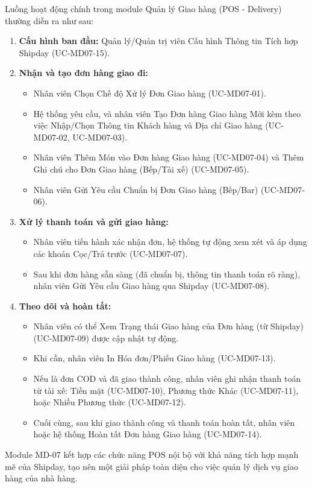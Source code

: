 \label{sssec:md07_overall_workflow}
Luồng hoạt động chính trong module Quản lý Giao hàng (POS - Delivery) thường diễn ra như sau:
\begin{enumerate}
    \item \textbf{Cấu hình ban đầu:} Quản lý/Quản trị viên Cấu hình Thông tin Tích hợp Shipday (UC-MD07-15).
    \item \textbf{Nhận và tạo đơn hàng giao đi:}
        \begin{itemize}
            \item Nhân viên Chọn Chế độ Xử lý Đơn Giao hàng (UC-MD07-01).
            \item Hệ thống yêu cầu, và nhân viên Tạo Đơn hàng Giao hàng Mới kèm theo việc Nhập/Chọn Thông tin Khách hàng và Địa chỉ Giao hàng (UC-MD07-02, UC-MD07-03).
            \item Nhân viên Thêm Món vào Đơn hàng Giao hàng (UC-MD07-04) và Thêm Ghi chú cho Đơn Giao hàng (Bếp/Tài xế) (UC-MD07-05).
            \item Nhân viên Gửi Yêu cầu Chuẩn bị Đơn Giao hàng (Bếp/Bar) (UC-MD07-06).
        \end{itemize}
    \item \textbf{Xử lý thanh toán và gửi giao hàng:}
        \begin{itemize}
            \item Nhân viên tiến hành xác nhận đơn, hệ thống tự động xem xét và áp dụng các khoản Cọc/Trả trước (UC-MD07-07).
            \item Sau khi đơn hàng sẵn sàng (đã chuẩn bị, thông tin thanh toán rõ ràng), nhân viên Gửi Yêu cầu Giao hàng qua Shipday (UC-MD07-08).
        \end{itemize}
    \item \textbf{Theo dõi và hoàn tất:}
        \begin{itemize}
            \item Nhân viên có thể Xem Trạng thái Giao hàng của Đơn hàng (từ Shipday) (UC-MD07-09) được cập nhật tự động.
            \item Khi cần, nhân viên In Hóa đơn/Phiếu Giao hàng (UC-MD07-13).
            \item Nếu là đơn COD và đã giao thành công, nhân viên ghi nhận thanh toán từ tài xế: Tiền mặt (UC-MD07-10), Phương thức Khác (UC-MD07-11), hoặc Nhiều Phương thức (UC-MD07-12).
            \item Cuối cùng, sau khi giao thành công và thanh toán hoàn tất, nhân viên hoặc hệ thống Hoàn tất Đơn hàng Giao hàng (UC-MD07-14).
        \end{itemize}
\end{enumerate}
Module MD-07 kết hợp các chức năng POS nội bộ với khả năng tích hợp mạnh mẽ của Shipday, tạo nên một giải pháp toàn diện cho việc quản lý dịch vụ giao hàng của nhà hàng.


